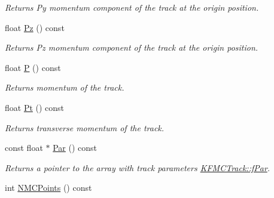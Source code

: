 \begin{DoxyCompactItemize}
\begin{DoxyCompactList}\small\item\em Returns Py momentum component of the track at the origin position. \end{DoxyCompactList}\item 
float \hyperlink{classKFMCTrack_ae195a31af880d220f6b8eeb40505fb05}{Pz} () const \hypertarget{classKFMCTrack_ae195a31af880d220f6b8eeb40505fb05}{}\label{classKFMCTrack_ae195a31af880d220f6b8eeb40505fb05}

\begin{DoxyCompactList}\small\item\em Returns Pz momentum component of the track at the origin position. \end{DoxyCompactList}\item 
float \hyperlink{classKFMCTrack_afaaa77ea16e048da48a10ecb27235433}{P} () const \hypertarget{classKFMCTrack_afaaa77ea16e048da48a10ecb27235433}{}\label{classKFMCTrack_afaaa77ea16e048da48a10ecb27235433}

\begin{DoxyCompactList}\small\item\em Returns momentum of the track. \end{DoxyCompactList}\item 
float \hyperlink{classKFMCTrack_ac15a4fddd79e4e9ff9c33ac57837ac25}{Pt} () const \hypertarget{classKFMCTrack_ac15a4fddd79e4e9ff9c33ac57837ac25}{}\label{classKFMCTrack_ac15a4fddd79e4e9ff9c33ac57837ac25}

\begin{DoxyCompactList}\small\item\em Returns transverse momentum of the track. \end{DoxyCompactList}\item 
const float $\ast$ \hyperlink{classKFMCTrack_a99849b9fff54ffbd99c277643d0007cf}{Par} () const \hypertarget{classKFMCTrack_a99849b9fff54ffbd99c277643d0007cf}{}\label{classKFMCTrack_a99849b9fff54ffbd99c277643d0007cf}

\begin{DoxyCompactList}\small\item\em Returns a pointer to the array with track parameters \hyperlink{classKFMCTrack_ab36c74aaad27e04eb0ae56afd538ba77}{K\+F\+M\+C\+Track\+::f\+Par}. \end{DoxyCompactList}\item 
int \hyperlink{classKFMCTrack_af7db977361c2867dd0c0d15fd0a64623}{N\+M\+C\+Points} () const \hypertarget{classKFMCTrack_af7db977361c2867dd0c0d15fd0a64623}{}\label{classKFMCTrack_af7db977361c2867dd0c0d15fd0a64623}


\end{DoxyCompactItemize}
